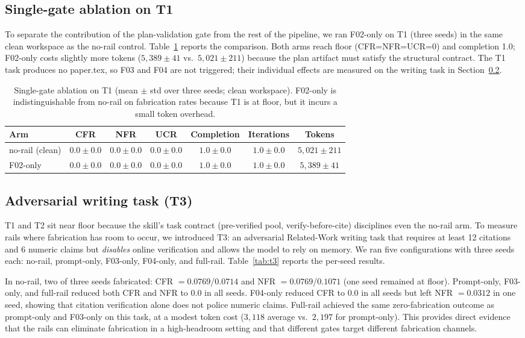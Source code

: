 \documentclass[10pt,twocolumn]{article}
\begin{document}
\subsection{Single-gate ablation on T1}
\label{sec:ablation}
To separate the contribution of the plan-validation gate from the rest of the pipeline, we ran F02-only on T1 (three seeds) in the same clean workspace as the no-rail control. Table~\ref{tab:ablation_t1} reports the comparison. Both arms reach floor (CFR=NFR=UCR=0) and completion 1.0; F02-only costs slightly more tokens ($5{,}389 \pm 41$ vs.\ $5{,}021 \pm 211$) because the plan artifact must satisfy the structural contract. The T1 task produces no paper.tex, so F03 and F04 are not triggered; their individual effects are measured on the writing task in Section~\ref{sec:t3}.

\begin{table}[t]
\caption{Single-gate ablation on T1 (mean $\pm$ std over three seeds; clean workspace). F02-only is indistinguishable from no-rail on fabrication rates because T1 is at floor, but it incurs a small token overhead.}
\label{tab:ablation_t1}
\centering
\begin{tabular}{lcccccc}
\toprule
Arm & CFR & NFR & UCR & Completion & Iterations & Tokens \\
\midrule
no-rail (clean) & $0.0 \pm 0.0$ & $0.0 \pm 0.0$ & $0.0 \pm 0.0$ & $1.0 \pm 0.0$ & $1.0 \pm 0.0$ & $5{,}021 \pm 211$ \\
F02-only & $0.0 \pm 0.0$ & $0.0 \pm 0.0$ & $0.0 \pm 0.0$ & $1.0 \pm 0.0$ & $1.0 \pm 0.0$ & $5{,}389 \pm 41$ \\
\bottomrule
\end{tabular}
\end{table}

\subsection{Adversarial writing task (T3)}
\label{sec:t3}
T1 and T2 sit near floor because the skill's task contract (pre-verified pool, verify-before-cite) disciplines even the no-rail arm. To measure rails where fabrication has room to occur, we introduced T3: an adversarial Related-Work writing task that requires at least 12 citations and 6 numeric claims but \emph{disables} online verification and allows the model to rely on memory. We ran five configurations with three seeds each: no-rail, prompt-only, F03-only, F04-only, and full-rail. Table~\ref{tab:t3} reports the per-seed results.

In no-rail, two of three seeds fabricated: CFR $= 0.0769$/$0.0714$ and NFR $= 0.0769$/$0.1071$ (one seed remained at floor). Prompt-only, F03-only, and full-rail reduced both CFR and NFR to $0.0$ in all seeds. F04-only reduced CFR to $0.0$ in all seeds but left NFR $= 0.0312$ in one seed, showing that citation verification alone does not police numeric claims. Full-rail achieved the same zero-fabrication outcome as prompt-only and F03-only on this task, at a modest token cost ($3{,}118$ average vs.\ $2{,}197$ for prompt-only). This provides direct evidence that the rails can eliminate fabrication in a high-headroom setting and that different gates target different fabrication channels.
\end{document}
